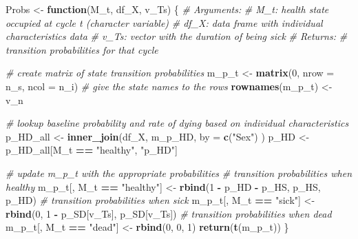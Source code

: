 \documentclass[
]{article}
\newenvironment{Shaded}{\begin{snugshade}}{\end{snugshade}}
\newcommand{\CommentTok}[1]{\textcolor[rgb]{0.56,0.35,0.01}{\textit{#1}}}
\newcommand{\ControlFlowTok}[1]{\textcolor[rgb]{0.13,0.29,0.53}{\textbf{#1}}}
\newcommand{\DataTypeTok}[1]{\textcolor[rgb]{0.13,0.29,0.53}{#1}}
\newcommand{\DecValTok}[1]{\textcolor[rgb]{0.00,0.00,0.81}{#1}}
\newcommand{\KeywordTok}[1]{\textcolor[rgb]{0.13,0.29,0.53}{\textbf{#1}}}
\newcommand{\NormalTok}[1]{#1}
\newcommand{\OperatorTok}[1]{\textcolor[rgb]{0.81,0.36,0.00}{\textbf{#1}}}
\newcommand{\StringTok}[1]{\textcolor[rgb]{0.31,0.60,0.02}{#1}}
\begin{document}
\begin{Shaded}
\begin{Highlighting}[]
\NormalTok{Probs <-}\StringTok{ }\ControlFlowTok{function}\NormalTok{(M_t, df_X, v_Ts) \{ }
  \CommentTok{# Arguments:}
    \CommentTok{# M_t: health state occupied  at cycle t (character variable)}
    \CommentTok{# df_X: data frame with individual characteristics data }
    \CommentTok{# v_Ts: vector with the duration of being sick}
  \CommentTok{# Returns: }
    \CommentTok{# transition probabilities for that cycle}
  
  \CommentTok{# create matrix of state transition probabilities}
\NormalTok{  m_p_t           <-}\StringTok{ }\KeywordTok{matrix}\NormalTok{(}\DecValTok{0}\NormalTok{, }\DataTypeTok{nrow =}\NormalTok{ n_s, }\DataTypeTok{ncol =}\NormalTok{ n_i)  }
  \CommentTok{# give the state names to the rows}
  \KeywordTok{rownames}\NormalTok{(m_p_t) <-}\StringTok{  }\NormalTok{v_n                               }
  
  \CommentTok{# lookup baseline probability and rate of dying based on individual characteristics}
\NormalTok{  p_HD_all <-}\StringTok{ }\KeywordTok{inner_join}\NormalTok{(df_X, m_p_HD, }\DataTypeTok{by =} \KeywordTok{c}\NormalTok{(}\StringTok{"Sex"}\NormalTok{) )}
\NormalTok{  p_HD     <-}\StringTok{ }\NormalTok{p_HD_all[M_t }\OperatorTok{==}\StringTok{ "healthy"}\NormalTok{, }\StringTok{"p_HD"}\NormalTok{]}
  
  \CommentTok{# update m_p_t with the appropriate probabilities   }
  \CommentTok{# transition probabilities when healthy}
\NormalTok{  m_p_t[, M_t }\OperatorTok{==}\StringTok{ "healthy"}\NormalTok{] <-}\StringTok{ }\KeywordTok{rbind}\NormalTok{(}\DecValTok{1} \OperatorTok{-}\StringTok{ }\NormalTok{p_HD }\OperatorTok{-}\StringTok{ }\NormalTok{p_HS, p_HS, p_HD)    }
  \CommentTok{# transition probabilities when sick }
\NormalTok{  m_p_t[, M_t }\OperatorTok{==}\StringTok{ "sick"}\NormalTok{]    <-}\StringTok{ }\KeywordTok{rbind}\NormalTok{(}\DecValTok{0}\NormalTok{, }\DecValTok{1} \OperatorTok{-}\StringTok{ }\NormalTok{p_SD[v_Ts], p_SD[v_Ts])  }
  \CommentTok{# transition probabilities when dead     }
\NormalTok{  m_p_t[, M_t }\OperatorTok{==}\StringTok{ "dead"}\NormalTok{]    <-}\StringTok{ }\KeywordTok{rbind}\NormalTok{(}\DecValTok{0}\NormalTok{, }\DecValTok{0}\NormalTok{, }\DecValTok{1}\NormalTok{)                            }
  \KeywordTok{return}\NormalTok{(}\KeywordTok{t}\NormalTok{(m_p_t))}
\NormalTok{\}       }
\end{Highlighting}
\end{Shaded}
\end{document}
